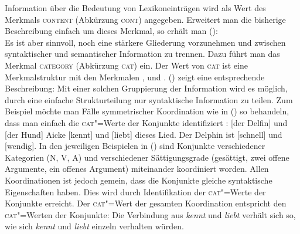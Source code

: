 Information über die Bedeutung von Lexikoneinträgen wird als Wert des Merkmals \textsc{content}
(Abkürzung \textsc{cont}) angegeben. Erweitert man die bisherige Beschreibung einfach
um dieses Merkmal, so erhält man (): 
\ea
      \\
\z
Es ist aber sinnvoll, noch eine stärkere Gliederung vorzunehmen und zwischen syntaktischer und semantischer
Information zu trennen. Dazu führt man das Merkmal \textsc{category} (Abkürzung \textsc{cat}) ein. Der Wert
von \textsc{cat} ist eine Merkmalstruktur mit den Merkmalen \head, \spr und \comps. ()
zeigt eine entsprechende Beschreibung:
\ea
\label{geom-cat-cont}
\z
Mit einer solchen Gruppierung der Information wird es möglich, durch eine einfache
Strukturteilung nur syntaktische Information zu teilen. Zum Beispiel möchte
man Fälle symmetrischer\label{page-symmetrische-koordination} Koordination wie in () so behandeln, dass
man einfach die \textsc{cat}"=Werte der Konjunkte identifiziert \citep[]{ps2}:
\eal
\ex {}[der Delfin] und [der Hund]
\ex Aicke [kennt] und [liebt] dieses Lied.
\ex Der Delphin ist [schnell] und [wendig].
\zl
In den jeweiligen Beispielen in () sind Konjunkte verschiedener Kategorien (N, V, A) und 
verschiedener Sättigungsgrade (gesättigt,
zwei offene Argumente, ein offenes Argument) miteinander
koordiniert worden. Allen Koordinationen ist jedoch gemein, dass die Konjunkte gleiche syntaktische
Eigenschaften haben. Dies wird durch Identifikation der \textsc{cat}"=Werte der Konjunkte erreicht.
Der \textsc{cat}"=Wert der gesamten Koordination entspricht den \textsc{cat}"=Werten der Konjunkte:
Die Verbindung aus \emph{kennt} und \emph{liebt} verhält sich so, wie sich \emph{kennt} und \emph{liebt}
einzeln verhalten würden.

